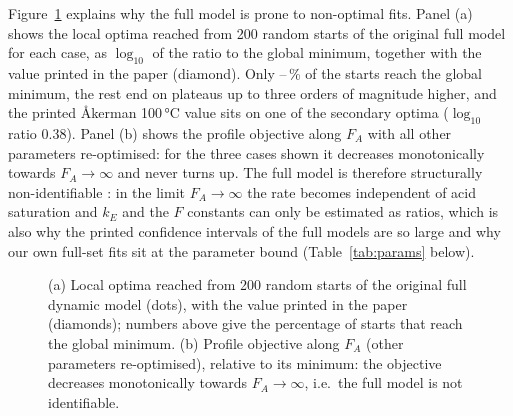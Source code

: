 Figure~\ref{fig:landscape} explains why the full model is prone to non-optimal fits. Panel (a) shows the local optima reached from 200 random starts of the original full model for each case, as $\log_{10}$ of the ratio to the global minimum, together with the value printed in the paper (diamond). Only \LandMinFrac--\LandMaxFrac\,\% of the starts reach the global minimum, the rest end on plateaus up to three orders of magnitude higher, and the printed Åkerman 100\,°C value sits on one of the secondary optima ($\log_{10}$ ratio 0.38). Panel (b) shows the profile objective along $F_A$ with all other parameters re-optimised: for the three cases shown it decreases monotonically towards $F_A\to\infty$ and never turns up. The full model is therefore structurally non-identifiable \cite{raue2009,transtrum2015}: in the limit $F_A\to\infty$ the rate becomes independent of acid saturation and $k_E$ and the $F$ constants can only be estimated as ratios, which is also why the printed confidence intervals of the full models are so large and why our own full-set fits sit at the parameter bound (Table~\ref{tab:params} below).
\begin{figure}[!htbp]\centering{}\caption{(a) Local optima reached from 200 random starts of the original full dynamic model (dots), with the value printed in the paper (diamonds); numbers above give the percentage of starts that reach the global minimum. (b) Profile objective along $F_A$ (other parameters re-optimised), relative to its minimum: the objective decreases monotonically towards $F_A\to\infty$, i.e.\ the full model is not identifiable.}\label{fig:landscape}\end{figure}


